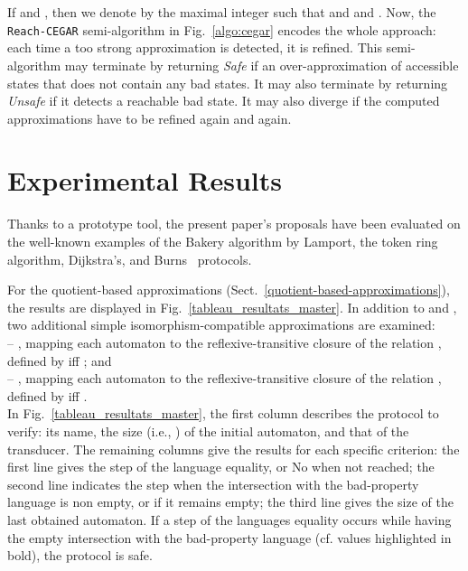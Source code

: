 \documentclass[]{llncs}
\begin{document}
If  and , then we denote by
 the maximal integer  such that  and  and
. Now, the {\tt
  Reach-CEGAR} semi-algorithm in Fig.~\ref{algo:cegar}
encodes the whole approach: each time a too strong approximation is
detected, it is refined. This semi-algorithm may terminate by
returning {\it Safe} if an over-approximation of accessible states
that does not contain any bad states. It may also
terminate by returning {\it Unsafe} if it detects a reachable bad state. 
It may also diverge if the computed approximations have to
be refined again and again.





\section{Experimental Results}\label{sec:experimentations}

Thanks to a prototype tool, the present paper's proposals have been evaluated on the
well-known examples of the
Bakery algorithm by Lamport, the token ring algorithm, Dijkstra's, and
Burns~\cite{touili_regular_2001} protocols.



For the quotient-based approximations
(Sect.~\ref{quotient-based-approximations}), the results are displayed in
Fig.~\ref{tableau_resultats_master}. 
In addition to  and , 
two additional simple isomorphism-compatible approximations are examined: \\
\noindent -- , mapping each automaton  to the
   reflexive-transitive closure of the relation , defined by  iff
 ; and \\
\noindent -- , mapping each automaton  to the
   reflexive-transitive closure of the relation , defined by  iff
 .\\
In Fig.~\ref{tableau_resultats_master}, the first column describes
 the protocol to verify: its name, the size (i.e., ) of the
 initial automaton, and that of the transducer. The remaining columns give the results for each specific criterion:
the first line gives the step of the language equality, or No when not reached;
the second line indicates the step when the intersection with the bad-property language is non empty, or  if it remains empty;
the third line gives the size of the last obtained automaton.
If a step of the languages equality occurs while having the empty intersection with the bad-property language (cf. values highlighted in bold), the protocol is safe.
\end{document}
